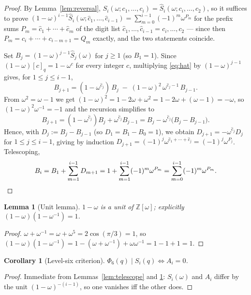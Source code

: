 \documentclass[11pt]{article}
\newtheorem{lemma}[theorem]{Lemma}
\newtheorem{corollary}[theorem]{Corollary}
\theoremstyle{remark}
\newcommand{\Z}{\mathbb{Z}}
\newcommand{\qint}[1]{[#1]_q}
\begin{document}
\begin{proof}
By Lemma~\ref{lem:reversal}, $S_i(\omega;c_1,\dots,c_i)=\hat S_i(\omega;c_i,\dots,c_2)$, so it
suffices to prove $(1-\omega)^{i-1}\hat S_i(\omega;\hat c_1,\dots,\hat c_{i-1})=\sum_{m=0}^{i-1}
(-1)^m\omega^{P_m}$ for the prefix sums $P_m=\hat c_1+\cdots+\hat c_m$ of the digit list $\hat
c_1,\dots,\hat c_{i-1}=c_i,\dots,c_2$ --- since then $P_m=c_i+\cdots+c_{i-m+1}=Q_m$ exactly, and
the two statements coincide.

Set $B_j=(1-\omega)^{j-1}\hat S_j(\omega)$ for $j\ge1$ (so $B_1=1$). Since
$(1-\omega)\qint{c}=1-\omega^c$ for every integer $c$, multiplying \eqref{eq:hat} by
$(1-\omega)^{j-1}$ gives, for $1\le j\le i-1$,
\[
B_{j+1} = (1-\omega^{\hat c_j})\,B_j \;-\; (1-\omega)^2\,\omega^{\hat c_j-1}\,B_{j-1}.
\]
From $\omega^2=\omega-1$ we get $(1-\omega)^2=1-2\omega+\omega^2=1-2\omega+(\omega-1)=-\omega$,
so $(1-\omega)^2\omega^{-1}=-1$ and the recursion simplifies to
\[
B_{j+1} = (1-\omega^{\hat c_j})B_j+\omega^{\hat c_j}B_{j-1}
    = B_j - \omega^{\hat c_j}\big(B_j-B_{j-1}\big).
\]
Hence, with $D_j:=B_j-B_{j-1}$ (so $D_1=B_1-B_0=1$), we obtain $D_{j+1}=-\omega^{\hat c_j}D_j$
for $1\le j\le i-1$, giving by induction $D_{j+1}=(-1)^{j}\omega^{\hat c_1+\cdots+\hat
c_j}=(-1)^j\omega^{P_j}$. Telescoping,
\[
B_i = B_1+\sum_{m=1}^{i-1}D_{m+1} = 1+\sum_{m=1}^{i-1}(-1)^m\omega^{P_m} =
\sum_{m=0}^{i-1}(-1)^m\omega^{P_m}. \qedhere
\]
\end{proof}

\begin{lemma}[Unit lemma]\label{lem:unit}
$1-\omega$ is a unit of $\Z[\omega]$; explicitly $(1-\omega)(1-\omega^{-1})=1$.
\end{lemma}

\begin{proof}
$\omega+\omega^{-1}=\omega+\omega^5=2\cos(\pi/3)=1$, so
$(1-\omega)(1-\omega^{-1})=1-(\omega+\omega^{-1})+\omega\omega^{-1}=1-1+1=1$.
\end{proof}

\begin{corollary}[Level-six criterion]\label{cor:level6}
$\Phi_6(q)\mid S_i(q) \iff A_i=0$.
\end{corollary}

\begin{proof}
Immediate from Lemmas~\ref{lem:telescope} and \ref{lem:unit}: $S_i(\omega)$ and $A_i$ differ by
the unit $(1-\omega)^{-(i-1)}$, so one vanishes iff the other does.
\end{proof}
\end{document}
